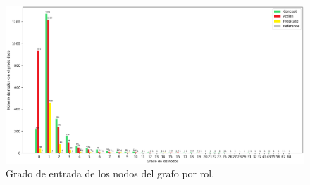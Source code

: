 \vspace{-0.49in}
\begin{figure}[H]
	\begin{center}
		\includegraphics[width=\textwidth]{graphics/degree4.png}
		\caption[Grado de entrada de los nodos del grafo por rol]{Grado de entrada de los nodos del grafo por rol.}
		\label{fig:in_degree_nodes_by_rol}
	\end{center}
\end{figure}

